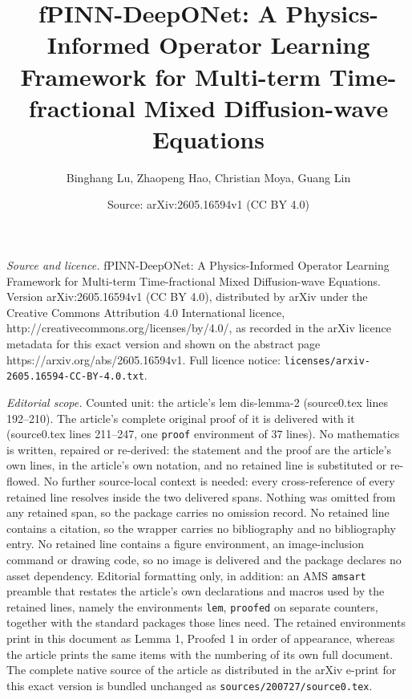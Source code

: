 \documentclass[10pt,a4paper]{amsart}
\title{fPINN-DeepONet: A Physics-Informed Operator Learning Framework for Multi-term Time-fractional Mixed Diffusion-wave Equations}
\author{Binghang Lu, Zhaopeng Hao, Christian Moya, Guang Lin}
\date{Source: arXiv:2605.16594v1 (CC BY 4.0)}
\begin{document}
\maketitle

\noindent\emph{Source and licence.} fPINN-DeepONet: A Physics-Informed Operator Learning Framework for Multi-term Time-fractional Mixed Diffusion-wave Equations. Version arXiv:2605.16594v1 (CC BY 4.0), distributed by arXiv under the Creative Commons Attribution 4.0 International licence, http://creativecommons.org/licenses/by/4.0/, as recorded in the arXiv licence metadata for this exact version and shown on the abstract page https://arxiv.org/abs/2605.16594v1. Full licence notice: \texttt{licenses/arxiv-2605.16594-CC-BY-4.0.txt}.\par\smallskip

\noindent\textit{Editorial scope.} Counted unit: the article's lem dis-lemma-2 (source0.tex lines 192--210). The article's complete original proof of it is delivered with it (source0.tex lines 211--247, one \texttt{proof} environment of 37 lines). No mathematics is written, repaired or re-derived: the statement and the proof are the article's own lines, in the article's own notation, and no retained line is substituted or re-flowed.  No further source-local context is needed: every cross-reference of every retained line resolves inside the two delivered spans.  Nothing was omitted from any retained span, so the package carries no omission record.  No retained line contains a citation, so the wrapper carries no bibliography and no bibliography entry.  No retained line contains a figure environment, an image-inclusion command or drawing code, so no image is delivered and the package declares no asset dependency.  Editorial formatting only, in addition: an AMS \texttt{amsart} preamble that restates the article's own declarations and macros used by the retained lines, namely the environments \texttt{lem}, \texttt{proofed} on separate counters, together with the standard packages those lines need.  The retained environments print in this document as Lemma 1, Proofed 1 in order of appearance, whereas the article prints the same items with the numbering of its own full document.  The complete native source of the article as distributed in the arXiv e-print for this exact version is bundled unchanged as \texttt{sources/200727/source0.tex}.
\end{document}
